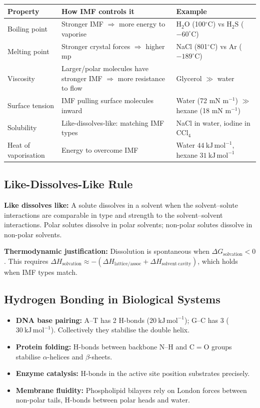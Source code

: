 \documentclass[12pt,a4paper]{article}
\begin{document}
\begin{tabularx}{\linewidth}{|B{3.0cm}|Y|Y|}
\hline
\textbf{Property} & \textbf{How IMF controls it} & \textbf{Example} \\
\hline
Boiling point & Stronger IMF $\Rightarrow$ more energy to vaporise & $\mathrm{H_2O}$ (100$^\circ$C) vs $\mathrm{H_2S}$ ($-60^\circ$C) \\
\hline
Melting point & Stronger crystal forces $\Rightarrow$ higher mp & NaCl (801$^\circ$C) vs Ar ($-189^\circ$C) \\
\hline
Viscosity & Larger/polar molecules have stronger IMF $\Rightarrow$ more resistance to flow & Glycerol $\gg$ water \\
\hline
Surface tension & IMF pulling surface molecules inward & Water (72 mN m$^{-1}$) $\gg$ hexane (18 mN m$^{-1}$) \\
\hline
Solubility & Like-dissolves-like: matching IMF types & NaCl in water, iodine in CCl$_4$ \\
\hline
Heat of vaporisation & Energy to overcome IMF & Water $44\ \mathrm{kJ\,mol^{-1}}$, hexane $31\ \mathrm{kJ\,mol^{-1}}$ \\
\hline
\end{tabularx}

\subsection{Like-Dissolves-Like Rule}
\begin{tcolorbox}[defbox]
\textbf{Like dissolves like:} A solute dissolves in a solvent when the solvent--solute interactions are comparable in type and strength to the solvent--solvent interactions. Polar solutes dissolve in polar solvents; non-polar solutes dissolve in non-polar solvents.
\end{tcolorbox}

\textbf{Thermodynamic justification:} Dissolution is spontaneous when $\Delta G_{\mathrm{solvation}} < 0$. This requires $\Delta H_{\mathrm{solvation}} \approx -(\Delta H_{\mathrm{lattice/assoc}} + \Delta H_{\mathrm{solvent\ cavity}})$, which holds when IMF types match.

\subsection{Hydrogen Bonding in Biological Systems}
\begin{itemize}[leftmargin=*, itemsep=2pt, topsep=2pt]
  \item \textbf{DNA base pairing:} A--T has 2 H-bonds ($20\ \mathrm{kJ\,mol^{-1}}$); G--C has 3 ($30\ \mathrm{kJ\,mol^{-1}}$). Collectively they stabilise the double helix.
  \item \textbf{Protein folding:} H-bonds between backbone N--H and C$=$O groups stabilise $\alpha$-helices and $\beta$-sheets.
  \item \textbf{Enzyme catalysis:} H-bonds in the active site position substrates precisely.
  \item \textbf{Membrane fluidity:} Phospholipid bilayers rely on London forces between non-polar tails, H-bonds between polar heads and water.
\end{itemize}
\end{document}
